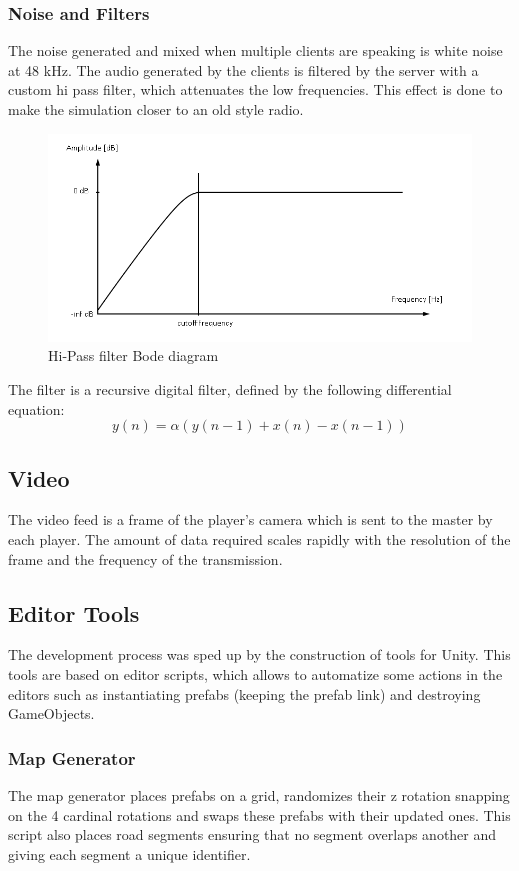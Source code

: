 \documentclass{article}
\begin{document}
\subsubsection{Noise and Filters \cite{filters}}
The noise generated and mixed when multiple clients are speaking is white noise at 48 kHz. The audio generated by the clients is filtered by the server with a custom hi pass filter, which attenuates the low frequencies. This effect is done to make the simulation closer to an old style radio.\\
\begin{figure}[H]
\includegraphics[width=\textwidth]{hipass}
\caption{Hi-Pass filter Bode diagram}
\end{figure}
\bigskip
The filter is a recursive digital filter, defined by the following differential equation:
\begin{equation} y(n) =\alpha (y(n-1) + x(n) - x(n-1))\end{equation}

\subsection{Video}
The video feed is a frame of the player's camera which is sent to the master by each player. The amount of data required scales rapidly with the resolution of the frame and the frequency of the transmission.

\subsection{Editor Tools}
The development process was sped up by the construction of tools for Unity. This tools are based on editor scripts, which allows to automatize some actions in the editors such as instantiating prefabs (keeping the prefab link) and destroying GameObjects.
\subsubsection{Map Generator}
The map generator places prefabs on a grid, randomizes their z rotation snapping on the 4 cardinal rotations and swaps these prefabs with their updated ones. This script also places road segments ensuring that no segment overlaps another and giving each segment a unique identifier.
\end{document}
